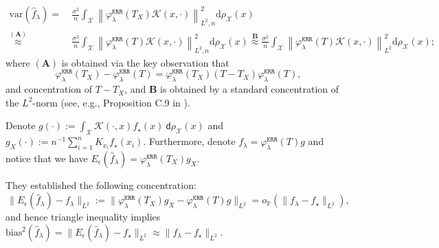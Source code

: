 \documentclass{article}
\theoremstyle{plain}
\theoremstyle{definition}
\theoremstyle{remark}
\newcommand{\calX}{\mathcal{X}}
\newcommand{\reg}{\varphi_\lambda}
\newcommand*{\krr}{\mathtt{KRR}}
\begin{document}
\begin{appendix}
\begin{equation}\label{eqn_approx_variance_fixed_d_learning_curve}
    \begin{aligned}
    \mathrm{var}(\hat{f}_{\lambda})
    =&~ \frac{\sigma^2}{n} \int_{\mathcal{X}} \left\|\reg^{\krr} \left(T_{X}\right) \mathscr{K}(x,\cdot)\right\|_{L^2,n}^2 \mathrm{d} \rho_{\calX}(x)\\
    \stackrel{(\mathbf{A})}{\approx} &~
    \frac{\sigma^2}{n}\int_{\mathcal{X}} \left\|{\reg^{\krr} \left(T\right) \mathscr{K}(x,\cdot)}\right\|_{L^2, n}^{2} \mathrm{d}\rho_{\calX}(x)
    \stackrel{\mathbf{B}}{\approx}
    \frac{\sigma^2}{n}\int_{\mathcal{X}} \left\|{\reg^{\krr} \left(T\right) \mathscr{K}(x,\cdot)}\right\|_{L^2}^{2} \mathrm{d}\rho_{\calX}(x);
    \end{aligned}
\end{equation}
where $(\mathbf{A})$ is obtained via the key observation that 
\begin{equation}\label{eqn_key_observation_in_approx_A_fixed_d_learning_curve}
    \reg^{\krr}(T_{X})-\reg^{\krr}(T) = \reg^{\krr}(T_{X})(T-T_{X})\reg^{\krr}(T),
\end{equation}
and concentration of $T-T_{X}$, and $\mathbf{B}$ is obtained by a standard concentration of the $L^2$-norm (see, e.g., Proposition C.9 in \cite{li2022saturation}).


Denote $g(\cdot) := \int_{\mathcal{X}} \mathscr{K}(\cdot,x) f_{\star}(x) ~\mathsf{d} \rho_{\calX}(x)$ and ${g}_{X}(\cdot) :=n^{-1} \sum_{i=1}^n K_{x_i} f_{\star}(x_i)$. Furthermore, denote $f_{\lambda} = \reg^{\krr}(T) g$ and notice that we have $E_\epsilon(\hat{f}_{\lambda}) = \reg^{\krr}(T_{X}) {g}_{X}$.

They established the following concentration:
\begin{equation}\label{eqn_approx_bias_fixed_d_learning_curve}
    \|E_\epsilon(\hat{f}_{\lambda}) - {f}_{\lambda}\|_{L^2} := \|\reg^{\krr}(T_{X}) {g}_{X} - \reg^{\krr}(T) g\|_{L^2} = o_{\mathbb{P}}\left(\| {f}_{\lambda} - f_{\star}\|_{L^2}\right),
\end{equation}
and hence triangle inequality implies $\mathrm{bias}^2(\hat{f}_{\lambda}) = \|E_\epsilon(\hat{f}_{\lambda}) - f_{\star}\|_{L^2} \approx \| {f}_{\lambda} - f_{\star}\|_{L^2}$.
    




\end{appendix}
\end{document}
